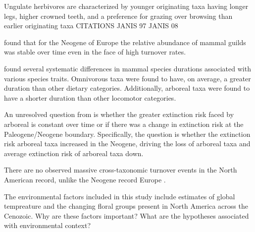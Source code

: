 \documentclass[12pt,letterpaper]{article}
\begin{document}
Ungulate herbivores are characterized by younger originating taxa having longer legs, higher crowned teeth, and a preference for grazing over browsing than earlier originating taxa \citep{Janis2004,Janis2000,Janis1993c} CITATIONS JANIS 97 JANIS 08

\citet{Jernvall2004} found that for the Neogene of Europe the relative abundance of mammal guilds was stable over time even in the face of high turnover rates.

\citet{Smits2015b} found several systematic differences in mammal species durations associated with various species traits. Omnivorous taxa were found to have, on average, a greater duration than other dietary categories. Additionally, arboreal taxa were found to have a shorter duration than other locomotor categories. 

An unresolved question from \citet{Smits2015b} is whether the greater extinction risk faced by arboreal is constant over time or if there was a change in extinction risk at the Paleogene/Neogene boundary. Specifically, the question is whether the extinction risk arboreal taxa increased in the Neogene, driving the loss of arboreal taxa and average extinction risk of arboreal taxa down. 

There are no observed massive cross-taxonomic turnover events in the North American record, unlike the Neogene record Europe \citep{Alroy2009,Alroy1996a,Eronen2015,Janis1993b,Alroy2000g}.




The environmental factors included in this study include estimates of global tempreature and the changing floral groups present in North America across the Cenozoic. Why are these factors important? What are the hypotheses associated with environmental context?
\end{document}
